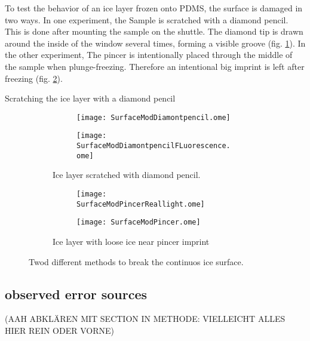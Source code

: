 To test the behavior of an ice layer frozen onto PDMS, the surface is damaged in two ways. In one experiment, the Sample is scratched with a diamond pencil. This is done after mounting the sample on the shuttle. The diamond tip is drawn around the inside of the window several times, forming a visible groove (fig. \ref{fig:ScratchedSample}). In the other experiment, The pincer is intentionally placed through the middle of the sample when plunge-freezing. Therefore an intentional big imprint is left after freezing (fig. \ref{fig:PincerImprint}).

Scratching the ice layer with a diamond pencil 

\begin{figure}[hbt!]
	\centering
	\begin{subfigure}[]{\textwidth}
		\centering
		\begin{subfigure}[]{0.45\textwidth}
			\centering
			\texttt{[image: SurfaceModDiamontpencil.ome]}
		\end{subfigure}	
		\begin{subfigure}[]{0.45\textwidth}
			\centering
			\texttt{[image: SurfaceModDiamontpencilFLuorescence.ome]}
		\end{subfigure}
		\caption{Ice layer scratched with diamond pencil.\\}
		\label{fig:ScratchedSample}	
	\end{subfigure}
	\begin{subfigure}[]{\textwidth}
		\centering
		\begin{subfigure}[]{0.45\textwidth}
			\centering		
			\texttt{[image: SurfaceModPincerReallight.ome]}	
		\end{subfigure}
		\begin{subfigure}[]{0.45\textwidth}
			\centering
			\texttt{[image: SurfaceModPincer.ome]}	
		\end{subfigure}
		\caption{Ice layer with loose ice near pincer imprint}
		\label{fig:PincerImprint}
	\end{subfigure}
	\caption{Twod different methods to break the continuos ice surface.}
	\label{fig:SurfaceMod}
\end{figure}

\FloatBarrier

\subsection{observed error sources}

(AAH ABKLÄREN MIT SECTION IN METHODE: VIELLEICHT ALLES HIER REIN ODER VORNE)

